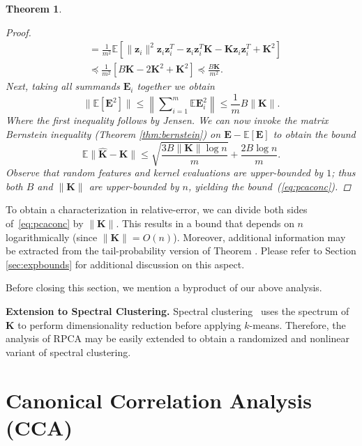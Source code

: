 \documentclass{article}
\newcommand{\E}{\mathbb{E}}
\newtheorem{theorem}{Theorem}
\begin{document}
\begin{theorem}
\begin{proof}
\begin{align*}
        &=\frac{1}{m^2} \mathbb{E} \left[\|\bm z_i\|^2\bm z_i\bm z_i^T - 
        \bm z_i\bm z_i^T\bm K - \bm{K}\bm{z}_i\bm{z}_i^T
        + \bm K^2\right]\\ 
      &\preceq \frac{1}{m^2} \left[
        B\bm K - 2\bm K^2 + \bm K^2\right] \preceq \frac{B\bm
        K}{m^2}.
      \end{align*}
      Next, taking all summands $\bm E_i$ together we obtain
      \begin{equation*}
        \|\mathbb{E}[\bm E^2]\| \leq \left\|\sum\nolimits_{i=1}^m \mathbb{E}\bm
        E_i^2\right\| \leq \frac{1}{m}{B\|\bm K\|}.
      \end{equation*}
      Where the first inequality follows by Jensen. We can now invoke the
      matrix Bernstein inequality (Theorem \ref{thm:bernstein}) on $\bm E - \E[\bm{E}]$ to
      obtain the bound
      \begin{equation*}
        \mathbb{E} \| {\hat{\bm K}} - \bm K\| \leq \sqrt{\frac{3B\|\bm K\|\log n}{m}} +
        \frac{2B\log n}{m}.
      \end{equation*}
      Observe that random features and kernel evaluations are upper-bounded by
      $1$; thus both $B$ and $\|\bm K\|$ are upper-bounded by $n$, yielding the
      bound~(\ref{eq:pcaconc}).
    \end{proof}
  \end{theorem}
  To obtain a characterization in relative-error, we can divide both sides
  of~\eqref{eq:pcaconc} by $\|\bm K\|$. This results in a bound that depends on
  $n$ logarithmically (since $\|\bm K\| = O(n)$). Moreover, additional
  information may be extracted from the tail-probability version of Theorem
  \label{thm:bernstein}.  Please refer to Section \ref{sec:expbounds} for
  additional discussion on this aspect.

  Before closing this section, we mention a byproduct of our above
  analysis.
  
  \textbf{Extension to Spectral Clustering.}
  Spectral clustering~\citep{Luxburg07}  uses the spectrum of $\bm K$ to perform
  dimensionality reduction before applying $k$-means. Therefore, the analysis
  of RPCA may be easily extended to obtain a randomized and nonlinear variant
  of spectral clustering.

  \section{Canonical Correlation Analysis (CCA)}
  \label{sec:cca}
  
\end{document}
